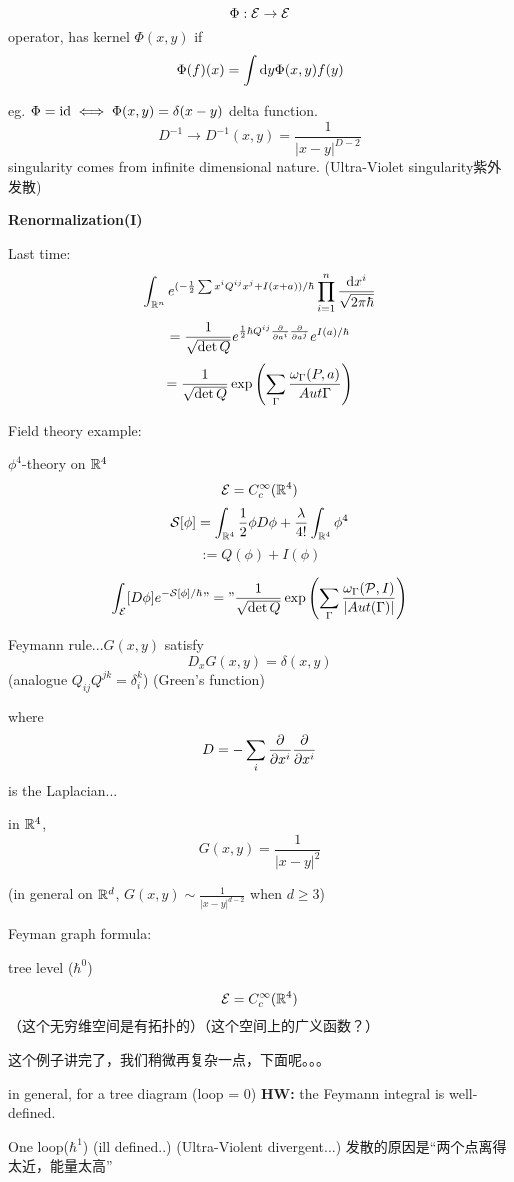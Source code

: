 $$\Phi:\mathcal{E}\to\mathcal{E}$$
operator, has kernel $\Phi(x,y)$ if
$$\Phi(f)(x)=\int\mathrm{d} y\Phi(x,y)f(y)$$

eg. $\Phi=\operatorname{id}\iff\Phi(x,y)=\delta(x-y)$ delta function.
$$D^{-1}\to D^{-1}(x,y)=\frac{1}{|x-y|^{D-2}}$$
singularity comes from infinite dimensional nature.
(Ultra-Violet singularity紫外发散)



\textbf{Renormalization(I)}

Last time:
$$\int_{\mathbb{R}^n}e^{(-\frac{1}{2}\sum x^iQ^{ij}x^j+I(x+a))/\hbar}
\prod_{i=1}^n\frac{\mathrm{d} x^i}{\sqrt{2\pi\hbar}}$$
$$=\frac{1}{\sqrt{\det Q}}e^{\frac{1}{2}\hbar Q^{ij}\frac{\partial } {\partial a^i}\frac{\partial } {\partial a^j}}e^{I(a)/\hbar}$$
$$=\frac{1}{\sqrt{\det Q}}\exp
\left(
  \sum_{\Gamma}
   \frac{\omega_\Gamma(P,a)}{Aut\Gamma}
\right)$$


Field theory example:

$\phi^4$-theory on $\mathbb{R}^4$
$$\mathcal{E}=C^{\infty}_c(\mathbb{R}^4)$$
$$\mathcal{S}[\phi]=\int_{\mathbb{R}^4}\frac{1}{2}\phi D\phi+\frac{\lambda}{4!}\int_{\mathbb{R}^4}\phi^4$$
$$:=Q(\phi)+I(\phi)$$

$$\int_{\mathcal{E}}[D\phi]e^{-\mathcal{S}[\phi]/\hbar}
"="\frac{1}{\sqrt{\det Q}}\exp
\left(
  \sum_{\Gamma}
    \frac{\omega_{\Gamma}(\mathcal{P},I)}
         {|Aut(\Gamma)|}
\right)$$

Feymann rule...$G(x,y)$ satisfy
$$D_xG(x,y)=\delta(x,y)$$
(analogue $Q_{ij}Q^{jk}=\delta^{k}_i$)
(Green's function)

where $$D=-\sum_i\frac{\partial } {\partial x^i}\frac{\partial } {\partial x^i}$$
is the Laplacian...

in $\mathbb{R}^4$,
$$G(x,y)=\frac{1}{|x-y|^2}$$

(in general on $\mathbb{R}^d$, $G(x,y)\sim\frac{1}{|x-y|^{d-2}}$ when $d\geq 3$)

Feyman graph formula:

tree level ($\hbar^0$)

$$\mathcal{E}=C_c^\infty(\mathbb{R}^4)$$
（这个无穷维空间是有拓扑的）（这个空间上的广义函数？）

这个例子讲完了，我们稍微再复杂一点，下面呢。。。

in general, for a tree diagram (loop = 0)
\textbf{HW:}
the Feymann integral is well-defined.

One loop($\hbar^1$)
(ill defined..)
(Ultra-Violent divergent...)
发散的原因是“两个点离得太近，能量太高”

